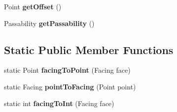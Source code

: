 \begin{DoxyCompactItemize}
\item 
\hypertarget{class_simple_r_p_g_1_1_map_object_a6f796cbf753b20dd31a745fb13cb6952}{Point {\bfseries get\+Offset} ()}\label{class_simple_r_p_g_1_1_map_object_a6f796cbf753b20dd31a745fb13cb6952}

\item 
\hypertarget{class_simple_r_p_g_1_1_map_object_a0c72f383828177a237a1347ce151a5ae}{Passability {\bfseries get\+Passability} ()}\label{class_simple_r_p_g_1_1_map_object_a0c72f383828177a237a1347ce151a5ae}

\end{DoxyCompactItemize}
\subsection*{Static Public Member Functions}
\begin{DoxyCompactItemize}
\item 
\hypertarget{class_simple_r_p_g_1_1_map_object_a52ee46b1a27838426c06d1324bcfde4e}{static Point {\bfseries facing\+To\+Point} (Facing face)}\label{class_simple_r_p_g_1_1_map_object_a52ee46b1a27838426c06d1324bcfde4e}

\item 
\hypertarget{class_simple_r_p_g_1_1_map_object_a4acb120e4b9fe431e0ad6f0ecb4ffb91}{static Facing {\bfseries point\+To\+Facing} (Point point)}\label{class_simple_r_p_g_1_1_map_object_a4acb120e4b9fe431e0ad6f0ecb4ffb91}

\item 
\hypertarget{class_simple_r_p_g_1_1_map_object_a213905eca91fb7aa102754c09bbb5d4b}{static int {\bfseries facing\+To\+Int} (Facing face)}\label{class_simple_r_p_g_1_1_map_object_a213905eca91fb7aa102754c09bbb5d4b}

\end{DoxyCompactItemize}
